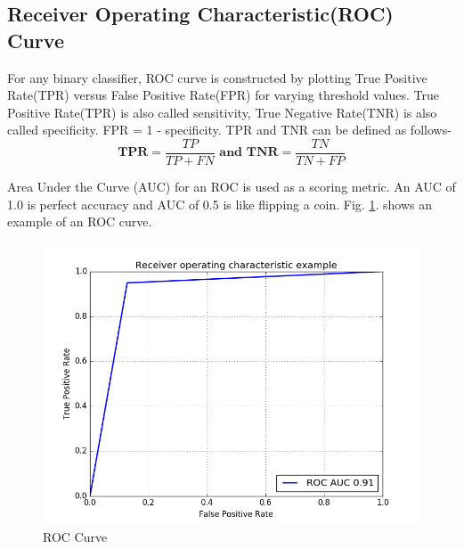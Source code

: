 \subsection{Receiver Operating Characteristic(ROC) Curve}
\par For any binary classifier, ROC curve is constructed by plotting True Positive Rate(TPR) versus False Positive Rate(FPR) for varying threshold values. True Positive Rate(TPR) is also called sensitivity, True Negative Rate(TNR) is also called specificity. FPR = 1 - specificity. TPR and TNR can be defined as follows- 
\[ \textbf{TPR} =  \frac{TP}{TP+FN}  \textbf{  and   TNR} =  \frac{TN}{TN+FP}    \]

\par Area Under the Curve (AUC) for an ROC is used as a scoring metric. An AUC of 1.0 is perfect accuracy and AUC of 0.5 is like flipping a coin. Fig. \ref{fig:rocCurve}. shows an example of an ROC curve.


\begin{figure}
	\centering
	\includegraphics[width=0.5\linewidth]{images/rocCurve}
	\caption{ROC Curve}
	\label{fig:rocCurve}
\end{figure}
